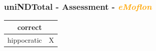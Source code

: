 \documentclass{beamer}
\newcommand{\cmark}{\ding{51}}%
\begin{document}
\begin{frame}
\frametitle{uniNDTotal - \textbf{Assessment} - \textbf{\textit{\textcolor{orange}{eMoflon}}}}

\begin{center}
\begin{tabular}{| r | c |}
  \hline                        
  correct & \cmark\\
  \hline
  hippocratic & X \\
  \hline 
\end{tabular}
\end{center}

\end{frame}
\end{document}
